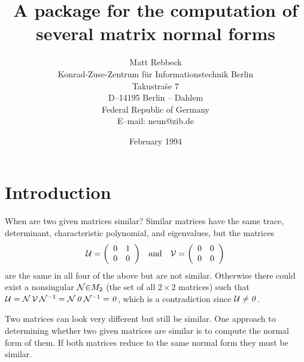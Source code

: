 \title{A \REDUCE{} package for the computation of several matrix 
normal forms}
\author{Matt Rebbeck \\ 
Konrad-Zuse-Zentrum f\"ur Informationstechnik Berlin \\
Takustra\"se 7  \\
D--14195 Berlin -- Dahlem \\
Federal Republic of Germany \\[0.05in]
E--mail: neun@zib.de \\[0.05in]
}
\date{February 1994}

\maketitle
{}


\section{Introduction}
When are two given matrices similar? Similar matrices have the same
trace, determinant, \hspace{0in} characteristic polynomial, 
\hspace{0in} and eigenvalues, \hspace{0in} but the matrices 
\begin{displaymath}
\begin{array}{ccc} {\cal U} = \left( \begin{array}{cc} 0 & 1 \\ 0 & 
0 \end{array} \right) & $and$ & {\cal V} = \left( \begin{array}{cc} 
0 & 0 \\ 0 & 0 \end{array} \right) \end{array} 
\end{displaymath}
are the same in all four of the above but are not similar. Otherwise 
there could exist a nonsingular ${\cal N} {\in} M_{2}$ (the set of 
all $2 \times 2$ matrices) such that ${\cal U} = {\cal N} \, {\cal V}
\, {\cal N}^{-1} = {\cal N} \, {\it 0} \, {\cal N}^{-1} = {\it 0}$, 
which is a contradiction since ${\cal U} \neq {\it 0}$.

Two matrices can look very different but still be similar. One 
approach to determining whether two given matrices are similar is to 
compute the normal form of them. If both matrices reduce to the same 
normal form they must be similar.

